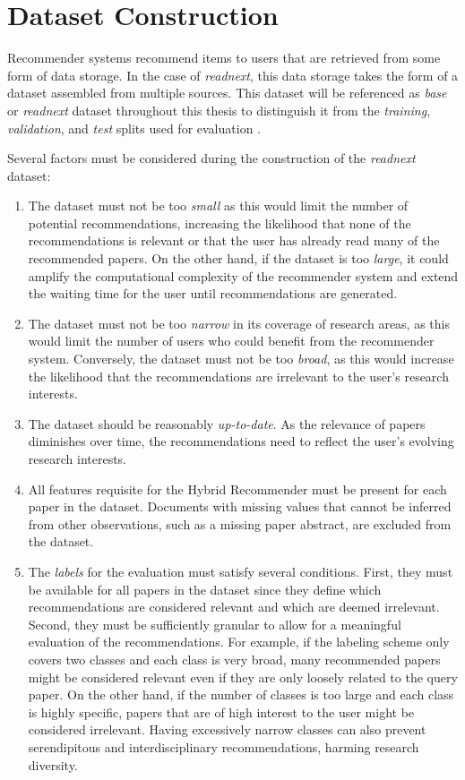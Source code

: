 \section{Dataset Construction} \label{sec:dataset-construction}

Recommender systems recommend items to users that are retrieved from some form of data storage. In the case of \emph{readnext}, this data storage takes the form of a dataset assembled from multiple sources.
This dataset will be referenced as \emph{base} or \emph{readnext} dataset throughout this thesis to distinguish it from the \emph{training}, \emph{validation}, and \emph{test} splits used for evaluation .

Several factors must be considered during the construction of the \emph{readnext} dataset:

\begin{enumerate}
      \item The dataset must not be too \emph{small} as this would limit the number of potential recommendations, increasing the likelihood that none of the recommendations is relevant or that the user has already read many of the recommended papers.
            On the other hand, if the dataset is too \emph{large}, it could amplify the computational complexity of the recommender system and extend the waiting time for the user until recommendations are generated.
      \item The dataset must not be too \emph{narrow} in its coverage of research areas, as this would limit the number of users who could benefit from the recommender system.
            Conversely, the dataset must not be too \emph{broad}, as this would increase the likelihood that the recommendations are irrelevant to the user's research interests.
      \item The dataset should be reasonably \emph{up-to-date}. As the relevance of papers diminishes over time, the recommendations need to reflect the user's evolving research interests.
      \item All features requisite for the Hybrid Recommender must be present for each paper in the dataset. Documents with missing values that cannot be inferred from other observations, such as a missing paper abstract, are excluded from the dataset.
      \item The \emph{labels} for the evaluation must satisfy several conditions. First, they must be available for all papers in the dataset since they define which recommendations are considered relevant and which are deemed irrelevant.
            Second, they must be sufficiently granular to allow for a meaningful evaluation of the recommendations. For example, if the labeling scheme only covers two classes and each class is very broad, many recommended papers might be considered relevant even if they are only loosely related to the query paper.
            On the other hand, if the number of classes is too large and each class is highly specific, papers that are of high interest to the user might be considered irrelevant. Having excessively narrow classes can also prevent serendipitous and interdisciplinary recommendations, harming research diversity.
\end{enumerate}


